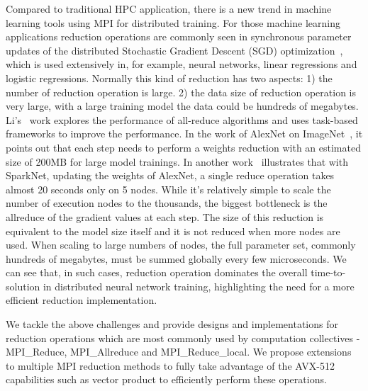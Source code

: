 \documentclass[sigconf,review]{acmart}
\newcommand{\mpi}[0]{\textsc{MPI}\xspace}
\begin{document}
Compared to traditional HPC application, there is a new trend in machine learning tools
using \mpi for distributed training. For those machine learning applications reduction operations
are commonly seen in synchronous parameter updates of the distributed Stochastic
Gradient Descent (SGD) optimization~\cite{sgd10}, which is used extensively
in, for example, neural networks, linear regressions and logistic
regressions. Normally this kind of reduction has two aspects: 1) the number of reduction
operation is large. 2) the data size of reduction operation is very large, with
a large training model the data could be hundreds of megabytes.
Li's~\cite{inproceedings} work explores the performance of all-reduce algorithms
and uses task-based frameworks to improve the performance.
In the work of AlexNet on ImageNet~\cite{NIPS2012_4824}, it points out that
each step needs to perform a weights reduction with an estimated size
of 200MB for large model trainings. In another work~\cite{moritz2015sparknet}
illustrates that with SparkNet, updating the weights of AlexNet, a single reduce
operation takes almost 20 seconds only on 5 nodes. While it's relatively simple to scale
the number of execution nodes to the thousands, the biggest bottleneck is the allreduce of
the gradient values at each step. The size of this reduction is equivalent
to the model size itself and it is not reduced when more
nodes are used. When scaling to large numbers of nodes, the full parameter set, commonly hundreds of
megabytes, must be summed globally every few microseconds. We can see that, in such cases,
reduction operation dominates the overall time-to-solution in distributed neural network
training, highlighting the need for a more efficient reduction implementation.

We tackle the above challenges and provide designs and implementations
for reduction operations which are most commonly used by computation
collectives - MPI\_Reduce, MPI\_Allreduce and MPI\_Reduce\_local.
We propose extensions to multiple \mpi reduction methods to fully take
advantage of the AVX-512 capabilities such as vector product to efficiently
perform these operations.
\end{document}
